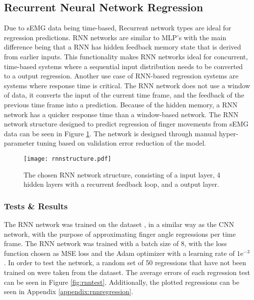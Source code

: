 \documentclass[../main.tex]{subfiles}
\begin{document}
\newpage
\subsection{Recurrent Neural Network Regression}

Due to \gls{sEMG} data being time-based, Recurrent network types are ideal for regression predictions.
\gls{RNN} networks are similar to \gls{MLP}'s with the main difference being that a \gls{RNN} has hidden feedback  memory state that is derived from earlier inputs.
This functionality makes \gls{RNN} networks ideal for concurrent, time-based systems where a sequential input distribution needs to be converted to a output regression.  
Another use case of \gls{RNN}-based regression systems are systems where response time is critical.
The \gls{RNN} network does not use a window of data, it converts the input of the current time frame, and the feedback of the previous time frame into a prediction.
Because of the hidden memory, a \gls{RNN} network has a quicker response time than a window-based network.
The \gls{RNN} network structure designed to predict regression of finger movements from \gls{sEMG} data can be seen in Figure \ref{fig:rnn_structure}.
The network is designed through manual hyper-parameter tuning based on validation error reduction of the model.



\begin{figure}[H]
\begin{center}
\texttt{[image: rnnstructure.pdf]}
\caption{The chosen RNN network structure, consisting of a input layer, 4 hidden layers with a recurrent feedback loop, and a output layer.}
\label{fig:rnn_structure}
\end{center}
\end{figure}

\subsubsection{Tests \& Results}

The \gls{RNN} network was trained on the dataset \cite{kinmusdataset}, in a similar way as the \gls{CNN} network, with the purpose of approximating finger angle regressions per time frame.
The RNN network was trained with a batch size of 8, with the loss function chosen as \gls{MSE} loss and the Adam optimizer with a learning rate of $1\text{e}^{-3}$.
In order to test the network, a random set of 50 regressions that have not been trained on were taken from the dataset.
The average errors of each regression test can be seen in Figure \ref{fig:rnntest}.
Additionally, the plotted regressions can be seen in Appendix \ref{appendix:rnnregression}.
\end{document}
